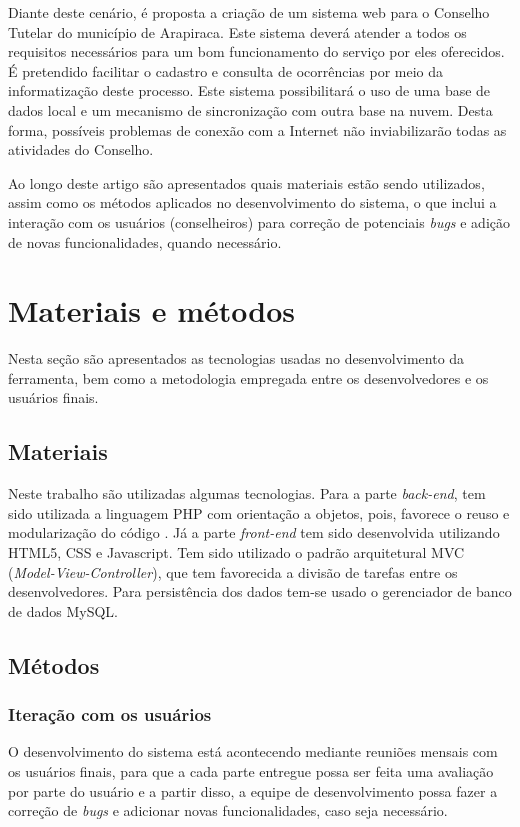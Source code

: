 \documentclass[12pt]{article}
\begin{document}
Diante deste cenário, é proposta a criação de um sistema web para o Conselho Tutelar do município de Arapiraca. Este sistema deverá atender a todos os requisitos necessários para um bom funcionamento do serviço por eles oferecidos. É pretendido facilitar o cadastro e consulta de ocorrências por meio da informatização deste processo. Este sistema possibilitará o uso de uma base de dados local e um mecanismo de sincronização com outra base na nuvem. Desta forma, possíveis problemas de conexão com a Internet não inviabilizarão todas as atividades do Conselho.

Ao longo deste artigo são apresentados quais materiais estão sendo utilizados, assim como os métodos aplicados no desenvolvimento do sistema, o que inclui a interação com os usuários (conselheiros) para correção de potenciais \textit{bugs} e adição de novas funcionalidades, quando necessário. 

\section{Materiais e métodos} 

Nesta seção são apresentados as tecnologias usadas no desenvolvimento da ferramenta, bem como a metodologia empregada entre os desenvolvedores e os usuários finais.

\subsection{Materiais}
Neste trabalho são utilizadas algumas tecnologias. Para a parte \textit{back-end}, tem sido utilizada a linguagem PHP com orientação a objetos, pois, favorece o reuso e modularização do código \cite{PHP}. Já a parte \textit{front-end} tem sido desenvolvida utilizando HTML5, CSS e Javascript. Tem sido utilizado o padrão arquitetural MVC (\textit{Model-View-Controller}), que tem favorecida a divisão de tarefas entre os desenvolvedores. Para persistência dos dados tem-se usado o gerenciador de banco de dados MySQL.

\subsection{Métodos}
\subsubsection*{Iteração com os usuários}

O desenvolvimento do sistema está acontecendo mediante reuniões mensais com os usuários finais, para que a cada parte entregue possa ser feita uma avaliação por parte do usuário e a partir disso, a equipe de desenvolvimento possa fazer a correção de \textit{bugs} e adicionar novas funcionalidades, caso seja necessário.
\end{document}
